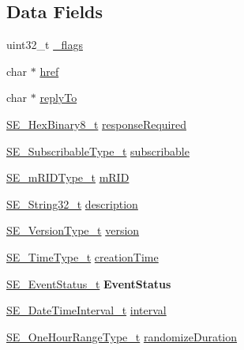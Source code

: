 \subsection*{Data Fields}
\begin{DoxyCompactItemize}
\item 
uint32\+\_\+t \hyperlink{group__EndDeviceControl_gac4952ef023e53ea6f68563ea53149671}{\+\_\+flags}
\item 
char $\ast$ \hyperlink{group__EndDeviceControl_gaae75efbe6c13cc0e8e0217103f629b44}{href}
\item 
char $\ast$ \hyperlink{group__EndDeviceControl_ga5098e3ee0cbe07d0bb9821563911c00c}{reply\+To}
\item 
\hyperlink{group__HexBinary8_gaecf2dab3615fb954a693c017a61f77d6}{S\+E\+\_\+\+Hex\+Binary8\+\_\+t} \hyperlink{group__EndDeviceControl_ga8bcd48a58db8fc4838ca0fa46fbfb5f6}{response\+Required}
\item 
\hyperlink{group__SubscribableType_ga5c41f553d369710ed34619266bf2551e}{S\+E\+\_\+\+Subscribable\+Type\+\_\+t} \hyperlink{group__EndDeviceControl_gaa9263c27137bebba854f6e4a0bebdd51}{subscribable}
\item 
\hyperlink{group__mRIDType_gac74622112f3a388a2851b2289963ba5e}{S\+E\+\_\+m\+R\+I\+D\+Type\+\_\+t} \hyperlink{group__EndDeviceControl_ga2d9078ee1ddd1569a54b6522d3d92777}{m\+R\+ID}
\item 
\hyperlink{group__String32_gac9f59b06b168b4d2e0d45ed41699af42}{S\+E\+\_\+\+String32\+\_\+t} \hyperlink{group__EndDeviceControl_ga545de4dad199d065df2673eaa0160606}{description}
\item 
\hyperlink{group__VersionType_ga4b8d27838226948397ed99f67d46e2ae}{S\+E\+\_\+\+Version\+Type\+\_\+t} \hyperlink{group__EndDeviceControl_gaf064d7556402ba5286fe5ced5ce2a4f4}{version}
\item 
\hyperlink{group__TimeType_ga6fba87a5b57829b4ff3f0e7638156682}{S\+E\+\_\+\+Time\+Type\+\_\+t} \hyperlink{group__EndDeviceControl_gaa9ee3d8e5ffcd87c3f77dd32d5ebc277}{creation\+Time}
\item 
\hyperlink{structSE__EventStatus__t}{S\+E\+\_\+\+Event\+Status\+\_\+t} {\bfseries Event\+Status}
\item 
\hyperlink{structSE__DateTimeInterval__t}{S\+E\+\_\+\+Date\+Time\+Interval\+\_\+t} \hyperlink{group__EndDeviceControl_ga6b0199442cfc19ab1caaf0005b9d1900}{interval}
\item 
\hyperlink{group__OneHourRangeType_ga2b9c57435b20a5fc0689922b77e97c2d}{S\+E\+\_\+\+One\+Hour\+Range\+Type\+\_\+t} \hyperlink{group__EndDeviceControl_ga403954727f4a26b9d25e0456d3f91340}{randomize\+Duration}

\end{DoxyCompactItemize}
